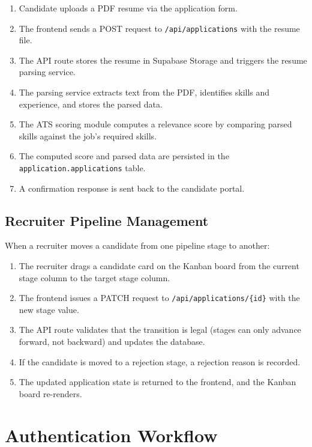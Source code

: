 \begin{enumerate}[leftmargin=1.5em]
  \item Candidate uploads a PDF resume via the application form.
  \item The frontend sends a POST request to \texttt{/api/applications} with the resume file.
  \item The API route stores the resume in Supabase Storage and triggers the resume parsing service.
  \item The parsing service extracts text from the PDF, identifies skills and experience, and stores the parsed data.
  \item The ATS scoring module computes a relevance score by comparing parsed skills against the job's required skills.
  \item The computed score and parsed data are persisted in the \texttt{application.applications} table.
  \item A confirmation response is sent back to the candidate portal.
\end{enumerate}

\subsection{Recruiter Pipeline Management}

When a recruiter moves a candidate from one pipeline stage to another:

\begin{enumerate}[leftmargin=1.5em]
  \item The recruiter drags a candidate card on the Kanban board from the current stage column to the target stage column.
  \item The frontend issues a PATCH request to \texttt{/api/applications/\{id\}} with the new stage value.
  \item The API route validates that the transition is legal (stages can only advance forward, not backward) and updates the database.
  \item If the candidate is moved to a rejection stage, a rejection reason is recorded.
  \item The updated application state is returned to the frontend, and the Kanban board re-renders.
\end{enumerate}

\section{Authentication Workflow}
\label{sec:auth-workflow}

